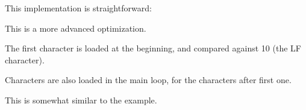 ﻿

This implementation is straightforward:




This is a more advanced optimization.

The first character is loaded at the beginning, and compared against 10 (the \ac{LF} character).

Characters are also loaded in the main loop, for the characters after first one.

This is somewhat similar to the  example.



